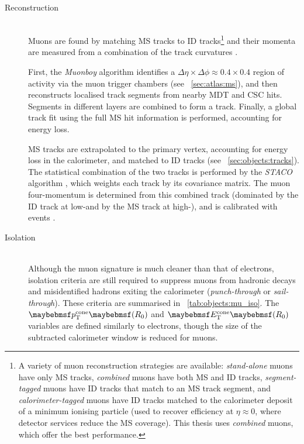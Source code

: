\begin{description}
\item[Reconstruction] \hfill \\
	Muons are found by matching MS tracks to ID tracks\footnote{
		A variety of muon reconstruction strategies are available: \textit{stand-alone} 
		muons have only MS tracks, \textit{combined} muons have both MS and 
		ID tracks, \textit{segment-tagged} muons have ID tracks that match to an 
		MS track segment, and \textit{calorimeter-tagged} muons have ID 
		tracks matched to the calorimeter deposit of a minimum ionising particle (used to 
		recover efficiency at $\eta \approx 0$, where detector services reduce the MS 
		coverage). This thesis uses \textit{combined} muons, which offer the best 
		performance.
	}
	and their momenta are measured from a combination of the track curvatures 
	\cite{ATLAS:ExpectPerf}.

	First, the \textit{Muonboy} algorithm \cite{Muons:algorithms} identifies a 
	$\Delta\eta \times \Delta\phi \approx 0.4 \times 0.4$ region of activity via the muon 
	trigger chambers (see \Section~\ref{sec:atlas:ms}), and then reconstructs localised 
	track segments from nearby MDT and CSC hits. Segments in different layers are combined 
	to form a track. Finally, a global track fit using the full MS hit information is 
	performed, accounting for energy loss.

	MS tracks are extrapolated to the primary vertex, accounting for energy loss in 
	the calorimeter, and matched to ID tracks (see 
	\Section~\ref{sec:objects:tracks}). The statistical combination of the two 
	tracks is performed by the \textit{STACO} algorithm \cite{Muons:algorithms}, which
	weights each track by its covariance matrix. The muon four-momentum is determined 
	from this combined track (dominated by the ID track at low-\pt and by the 
	MS track at high-\pt), and is calibrated with \HepProcess{\PZ \HepTo \Pmu\Pmu}
	events \cite{Muons:2012}.

\item[Isolation] \hfill \\
	Although the muon signature is much cleaner than that of electrons, isolation criteria 
	are still required to suppress muons from hadronic decays and misidentified hadrons 
	exiting the calorimeter (\textit{punch-through} or \textit{sail-through}). These 
	criteria are summarised in \Table~\ref{tab:objects:mu_iso}. The $\ptcone{R_0}$ and 
	$\etcone{R_0}$ variables are defined similarly to electrons, though the size of the 
	subtracted calorimeter window is reduced for muons.


\end{description}
